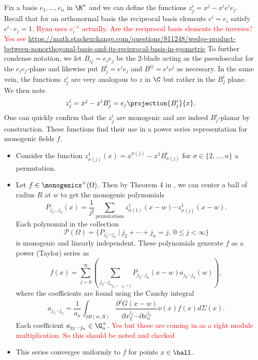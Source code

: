 Fix a basis $e_1,\dots,e_n$ in $\R^n$ and we can define the functions $z_j^i = x^j - x^i e^i e_j$. Recall that for an orthonormal basis the reciprocal basis elements $e^i=e_i$ satisfy $e^i \cdot e_j = 1$. \textcolor{red}{Ryan uses $e_i^{-1}$ actually. Are the reciprocal basis elements the inverses? Yes see \url{https://math.stackexchange.com/questions/811248/wedge-product-between-nonorthogonal-basis-and-its-reciprocal-basis-in-geometric}} To further condense notation, we let $B_{ij}=e_i e_j$ be the 2-blade acting as the pseudoscalar for the $e_i e_j$-plane and likewise put $B_j^i = e^ie_j$ and $B^{ij}=e^i e^j$ as necessary. In the same vein, the functions $z_j^i$ are very analogous to $z$ in $\C$ but rather in the $B_j^i$ plane.  We then note
\[
z_j^i = x^j - x^i B_j^i = e_j\projection{B_j^i}{x}.
\]
One can quickly confirm that the $z_j^i$ are monogenic and are indeed $B_j^i$-planar by construction. These functions find their use in a power series representation for monogenic fields $f$.
\begin{itemize}
    \item Consider the function $z_{\sigma(j)}^1(x)=x^{\sigma(j)} - x^1 B_{\sigma(j)}^i$ for $\sigma \in \{2,\dots,n\}$ a permutation.  
    \item Let $f \in \monogenics^+(\Omega)$.  Then by Theorem 4 in \cite{ryan_clifford_2004}, we can center a ball of radius $R$ at $w$ to get the monogenic polynomials
    \[
        P_{j_2 \dots j_n}(x) = \frac{1}{j!} \sum_{\textrm{permutations}}z_{\sigma(1)}^1(x-w) \cdots z_{\sigma(j)}^1(x-w).
    \]
    Each polynomial in the collection
    \[
    \mathcal{P}(\Omega) = \{P_{j_2 \cdots j_n} ~\vert~ j_2+\cdots+j_n = j, ~0\leq j < \infty\}
    \]
    is monogenic and linearly independent.
    These polynomials generate $f$ as a power (Taylor) series as
    \[
        f(x) = \sum_{j=0}^\infty \left(\sum_{{j_2 \cdots j_n}_{j_2 + \cdots j_n = j}} P_{j_2 \cdots j_n} (x-w) a_{j_2 \cdots j_n}(w) \right),
    \]
    where the coefficients are found using the Cauchy integral
    \[
        a_{j_2 \cdots j_n} = \frac{1}{a_n} \int_{\partial B(w,R)} \frac{\partial^j G(x-w)}{\partial x_2^{j_2} \cdots \partial x_n^{j_n}} \nu(x) f(x) d\Sigma(x).
    \]
    Each coefficient $a_{j_2 \cdots j_n} \in \G_n^+$. \textcolor{red}{Yes but these are coming in as a right module multiplication. So this should be noted and checked}
    \item This series converges uniformly to $f$ for points $x\in \ball$.
\end{itemize}


